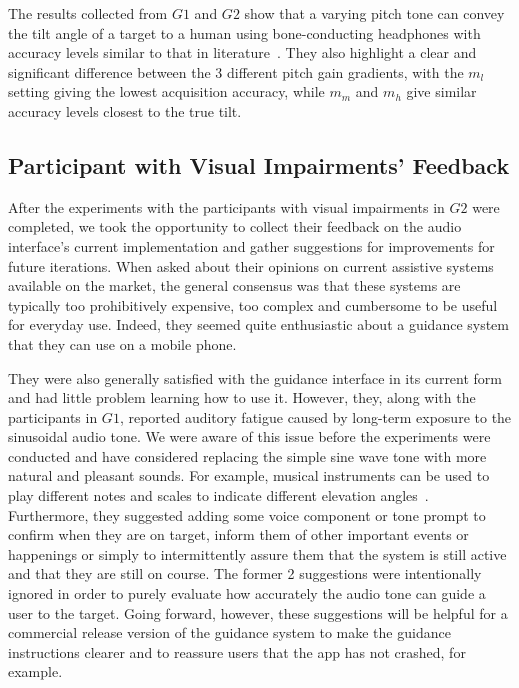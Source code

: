 \documentclass[sigconf, screen=true, anonymous=true]{acmart}
\begin{document}
The results collected from $G1$ and $G2$ show that a varying pitch tone can convey the tilt angle of a target to a human using bone-conducting headphones with accuracy levels similar to that in literature~\cite{bujacz2011sonification, katz2011spatial, zotkin2004rendering}.
They also highlight a clear and significant difference between the 3 different pitch gain gradients, with the $m_l$ setting giving the lowest acquisition accuracy, while $m_m$ and $m_h$ give similar accuracy levels closest to the true tilt. 

\subsection{Participant with Visual Impairments' Feedback}

After the experiments with the participants with visual impairments in $G2$ were completed, we took the opportunity to collect their feedback on the audio interface's current implementation and gather suggestions for improvements for future iterations.
When asked about their opinions on current assistive systems available on the market, the general consensus was that these systems are typically too prohibitively expensive, too complex and cumbersome to be useful for everyday use.
Indeed, they seemed quite enthusiastic about a guidance system that they can use on a mobile phone.

They were also generally satisfied with the guidance interface in its current form and had little problem learning how to use it.
However, they, along with the participants in $G1$, reported auditory fatigue caused by long-term exposure to the sinusoidal audio tone.
We were aware of this issue before the experiments were conducted and have considered replacing the simple sine wave tone with more natural and pleasant sounds.
For example, musical instruments can be used to play different notes and scales to indicate different elevation angles~\cite{brewster1998using}.
Furthermore, they suggested adding some voice component or tone prompt to confirm when they are on target, inform them of other important events or happenings or simply to intermittently assure them that the system is still active and that they are still on course.
The former 2 suggestions were intentionally ignored in order to purely evaluate how accurately the audio tone can guide a user to the target.
Going forward, however, these suggestions will be helpful for a commercial release version of the guidance system to make the guidance instructions clearer and to reassure users that the app has not crashed, for example.
\end{document}
